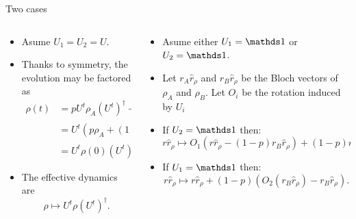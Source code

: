 \begin{frame}{Two cases}
    \begin{columns}
        \begin{column}{0.5\textwidth}
            \begin{itemize}
                \item Asume $U_{1}= U_{2}=U$.
                \item Thanks to symmetry, the evolution may be factored as
                \begin{align*}
                    \rho(t)&=pU^{t}\rho_{A}(U^{t})^{\dag}+(1-p)U^{t}\rho_{B}(U^{t})^{\dag} \\
                    &=U^{t}(p\rho_{A}+(1-p)\rho_{B})(U^{t})^{\dag}\\
                    &=U^{t}\rho(0)(U^{t})^{\dag}.
                    \end{align*}
                \item The effective dynamics are    
                \begin{equation*}
                    \rho\mapsto U^{t}\rho(U^{t})^{\dag}.
                \end{equation*}
            \end{itemize}
        \end{column}
        \begin{column}{0.5\textwidth}
            \begin{itemize}
                \item Asume either $U_{1}=\Id$ or $U_{2}=\Id$.
                \item Let $r_{A}\hat{r}_{\rho}$ and $r_{B}\hat{r}_{\rho}$ be the Bloch vectors of $\rho_{A}$ and $\rho_{B}$. Let $O_{i}$ be the rotation induced by $U_{i}$
                \item If $U_{2}=\Id$ then:
                \begin{equation*}
                    r\hat{r}_{\rho}\mapsto O_{1}(r\hat{r}_{\rho}-(1-p)r_{B}\hat{r}_{\rho})+(1-p)r_{B}\hat{r}_{\rho}.
                \end{equation*}
                \item If $U_{1}=\Id$ then:
                \begin{equation*}
                    r\hat{r}_{\rho}\mapsto r\hat{r}_{\rho}+(1-p)(O_{2}(r_{B}\hat{r}_{\rho})-r_{B}\hat{r}_{\rho}).
                \end{equation*}
            \end{itemize}
        \end{column}
    \end{columns}
\end{frame}


